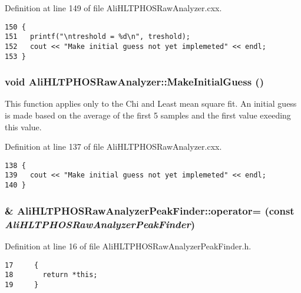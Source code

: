 Definition at line 149 of file Ali\-HLTPHOSRaw\-Analyzer.cxx.

\footnotesize\begin{verbatim}150 {
151   printf("\ntreshold = %d\n", treshold);
152   cout << "Make initial guess not yet implemeted" << endl;  
153 }
\end{verbatim}\normalsize 


\subsubsection{\setlength{\rightskip}{0pt plus 5cm}void Ali\-HLTPHOSRaw\-Analyzer::Make\-Initial\-Guess ()\hspace{0.3cm}{\tt  [inherited]}}\label{classAliHLTPHOSRawAnalyzer_AliHLTPHOSRawAnalyzerPeakFindera15}


This function applies only to the Chi and Least mean square fit. An initial guess is made based on the average of the first 5 samples and the first value exeeding this value. 

Definition at line 137 of file Ali\-HLTPHOSRaw\-Analyzer.cxx.

\footnotesize\begin{verbatim}138 {
139   cout << "Make initial guess not yet implemeted" << endl;
140 }
\end{verbatim}\normalsize 


\subsubsection{\& Ali\-HLTPHOSRaw\-Analyzer\-Peak\-Finder::operator= (const  {\em Ali\-HLTPHOSRaw\-Analyzer\-Peak\-Finder})\hspace{0.3cm}{\tt  [inline]}}\label{classAliHLTPHOSRawAnalyzerPeakFinder_AliHLTPHOSRawAnalyzerPeakFindera2}




Definition at line 16 of file Ali\-HLTPHOSRaw\-Analyzer\-Peak\-Finder.h.

\footnotesize\begin{verbatim}17     {
18       return *this; 
19     }
\end{verbatim}\normalsize 


